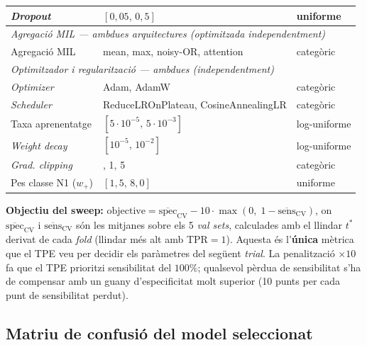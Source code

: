 \documentclass[10pt,a4paper,twocolumn,twoside]{article}
\begin{document}
\begin{table}[H]
\begin{tabular}{p{5.0cm}>{\raggedleft\arraybackslash}p{5.3cm}>{\raggedleft\arraybackslash}p{3.0cm}}
\textit{Dropout}                            & $[0{,}05,\,0{,}5]$                         & uniforme \\
\midrule
\multicolumn{3}{l}{\textit{Agregació MIL --- ambdues arquitectures (optimitzada independentment)}} \\[2pt]
Agregació MIL                               & mean, max, noisy-OR, attention             & categòric \\
\midrule
\multicolumn{3}{l}{\textit{Optimitzador i regularització --- ambdues (independentment)}} \\[2pt]
\textit{Optimizer}                          & Adam, AdamW                                & categòric \\
\textit{Scheduler}                          & ReduceLROnPlateau, CosineAnnealingLR       & categòric \\
Taxa aprenentatge                           & $[5\cdot10^{-5},\,5\cdot10^{-3}]$         & log-uniforme \\
\textit{Weight decay}                       & $[10^{-5},\,10^{-2}]$                      & log-uniforme \\
\textit{Grad. clipping}                     & 0, 1, 5                                    & categòric \\
Pes classe N1 ($w_+$)                       & $[1{,}5,\,8{,}0]$                          & uniforme \\
\bottomrule
\end{tabular}
\end{table}

\textbf{Objectiu del sweep:}
$\text{objective} = \overline{\text{spec}}_{\text{CV}} - 10 \cdot \max(0,\; 1 - \overline{\text{sens}}_{\text{CV}})$,
on $\overline{\text{spec}}_{\text{CV}}$ i $\overline{\text{sens}}_{\text{CV}}$ són les mitjanes
sobre els 5 \textit{val sets}, calculades amb el llindar $t^*$ derivat de cada \textit{fold}
(llindar més alt amb TPR$=1$). Aquesta és l'\textbf{única} mètrica que el TPE veu per decidir
els paràmetres del següent \textit{trial}. La penalització $\times 10$ fa que el TPE prioritzi
sensibilitat del $100\%$; qualsevol pèrdua de sensibilitat s'ha de compensar
amb un guany d'especificitat molt superior (10 punts per cada punt de sensibilitat perdut).

\subsection{Matriu de confusió del model seleccionat}
\label{app:cm}
\end{document}
